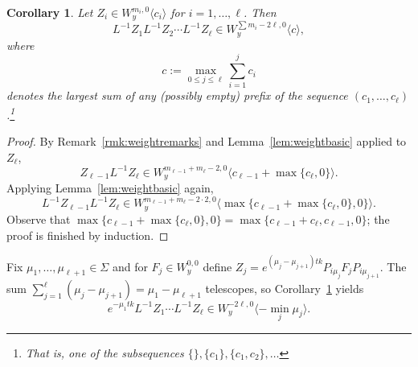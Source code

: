 \documentclass{article}
\newcommand{\inv}{^{-1}}
\newcommand{\Spectrum}{\Sigma}
\newtheorem{corollary}[theorem]{Corollary}
\theoremstyle{definition}
\theoremstyle{remark}
\begin{document}
\begin{corollary}
    \label{cor:evstring}
    Let $Z_i \in W^{m_i, 0}_y \langle c_i \rangle$ for $i = 1, \ldots, \ell$.
    Then
    \[
        L\inv Z_1 L\inv Z_2 \cdots L\inv Z_\ell \in W^{\sum m_i - 2\ell, 0}_y\langle c \rangle, 
    \]
    where
    \[
        c := \max_{0 \le j \le \ell} \sum_{i=1}^j c_i
    \]
    denotes the largest sum of any (possibly empty) prefix of the sequence $(c_1, \ldots, c_\ell)$.\footnote{That is, one of the subsequences $\{\}, \{c_1\}, \{c_1, c_2\}, \ldots$}
\end{corollary}
\begin{proof}
    By Remark~\ref{rmk:weightremarks} and Lemma~\ref{lem:weightbasic} applied to $Z_\ell$,
    \[
        Z_{\ell-1} L\inv Z_\ell \in W^{m_{\ell-1} + m_\ell - 2, 0}_y \langle c_{\ell-1} + \max\{c_\ell,0\} \rangle.
    \]
    Applying Lemma~\ref{lem:weightbasic} again,
    \[
        L\inv Z_{\ell-1} L\inv Z_\ell \in W^{m_{\ell-1} + m_\ell - 2 \cdot 2, 0}_y \langle \max\{c_{\ell-1} + \max\{c_\ell,0\}, 0\} \rangle.
    \]
    Observe that $\max\{c_{\ell-1} + \max\{c_\ell,0\},0\} = \max\{c_{\ell-1} + c_\ell, c_{\ell-1}, 0\}$; the proof is finished by induction.
\end{proof}


Fix $\mu_1, \ldots, \mu_{\ell+1} \in \Spectrum$ and for $F_j \in W^{0,0}_y$ define $Z_j = e^{(\mu_j - \mu_{j+1})tk} P_{i \mu_{j}} F_j P_{i \mu_{j+1}}$.
The sum $\sum_{j=1}^\ell (\mu_j - \mu_{j+1}) = \mu_1 - \mu_{\ell+1}$ telescopes, so Corollary~\ref{cor:evstring} yields
\begin{equation}
    \label{eq:decay}
    e^{-\mu_1 tk} L\inv Z_1 \cdots L\inv Z_\ell \in W^{-2\ell,0}_y \langle - \min_j \mu_j \rangle.
\end{equation}
\end{document}
